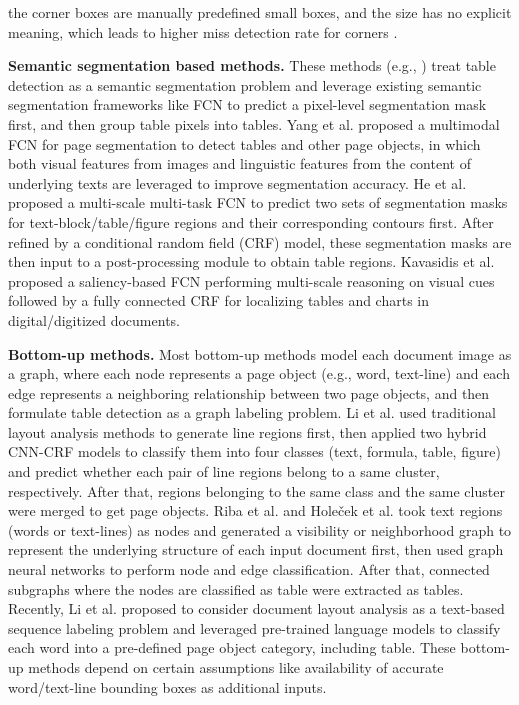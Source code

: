\documentclass[final,3p,times,twocolumn]{elsarticle}
\begin{document}
the corner boxes are manually predefined small boxes, and the size has no explicit meaning, which leads to higher miss detection rate for corners \cite{sun2019faster}. 

\textbf{Semantic segmentation based methods.} These methods (e.g., \cite{yang2017learning,he2017multi,kavasidis2019saliency,paliwal2019tablenet}) treat table detection as a semantic segmentation problem and leverage existing semantic segmentation frameworks like FCN \cite{long2015fully} to predict a pixel-level segmentation mask first, and then group table pixels into tables. Yang et al. \cite{yang2017learning} proposed a multimodal FCN for page segmentation to detect tables and other page objects, in which both visual features from images and linguistic features from the content of underlying texts are leveraged to improve segmentation accuracy. He et al. \cite{he2017multi} proposed a multi-scale multi-task FCN to predict two sets of segmentation masks for text-block/table/figure regions and their corresponding contours first. After refined by a conditional random field (CRF) model, these segmentation masks are then input to a post-processing module to obtain table regions. Kavasidis et al. \cite{kavasidis2019saliency} proposed a saliency-based FCN performing multi-scale reasoning on visual cues followed by a fully connected CRF for localizing tables and charts in digital/digitized documents. 

\textbf{Bottom-up methods.} Most bottom-up methods model each document image as a graph, where each node represents a page object (e.g., word, text-line) and each edge represents a neighboring relationship between two page objects, and then formulate table detection as a graph labeling problem. Li et al. \cite{li2018page} used traditional layout analysis methods to generate line regions first, then applied two hybrid CNN-CRF models to classify them into four classes (text, formula, table, figure) and predict whether each pair of line regions belong to a same cluster, respectively. After that, regions belonging to the same class and the same cluster were merged to get page objects. Riba et al. \cite{riba2022table} and Holeček et al. \cite{holevcek2019table} took text regions (words or text-lines) as nodes and generated a visibility or neighborhood graph to represent the underlying structure of each input document first, then used graph neural networks to perform node and edge classification. After that, connected subgraphs where the nodes are classified as table were extracted as tables. Recently, Li et al. \cite{li2020docbank} proposed to consider document layout analysis as a text-based sequence labeling problem and leveraged pre-trained language models to classify each word into a pre-defined page object category, including table. These bottom-up methods depend on certain assumptions like availability of accurate word/text-line bounding boxes as additional inputs.
\end{document}
